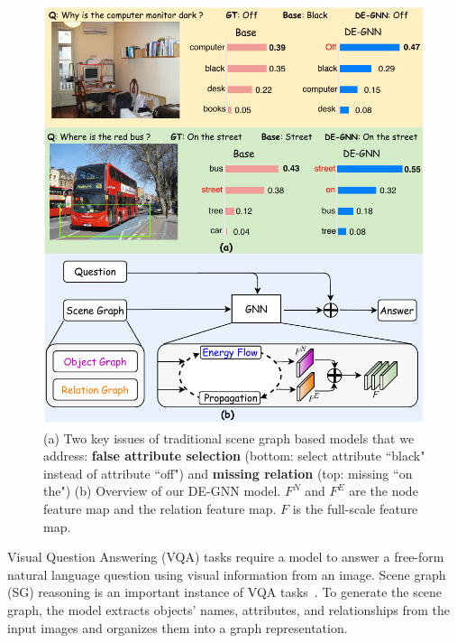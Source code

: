 \documentclass[letterpaper]{article} %
\begin{document}
\begin{figure}[ht] 
    \centering 
    \includegraphics[scale=0.6]{./pic/intro5.pdf} 
    \caption{(a) Two key issues of traditional scene graph based models that we address: \textbf{false attribute selection} (bottom: select attribute ``black" instead of attribute ``off") and \textbf{missing relation} (top: missing ``on the") (b) Overview of our DE-GNN model. $F^N$ and $F^E$ are the node feature map and the relation feature map. $F$ is the full-scale feature map.} 
    \label{scene-graph} 
    \vspace{-0.1in}
\end{figure}

 Visual Question Answering (VQA) tasks require a model to answer a free-form natural language question using visual information from an image. Scene graph (SG) reasoning is an important instance of VQA tasks~\cite{DBLP:journals/corr/abs-2007-01072}. 
To generate the scene graph, the model extracts objects' names, attributes, and relationships from the input images and organizes them into a graph representation.
\end{document}
